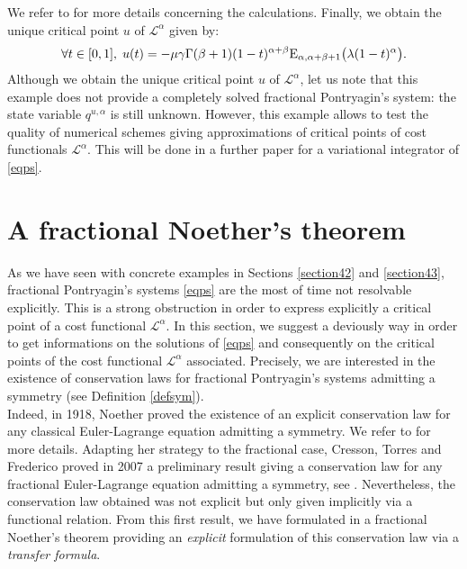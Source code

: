 \documentclass[english,11pt,reqno]{smfart}
\newcommand{\LL}{\mathcal{L}}
\begin{document}
We refer to \cite{kilb} for more details concerning the calculations. Finally, we obtain the unique critical point $u$ of $\LL^\alpha$ given by: 
\begin{equation}
\forall t \in [0,1], \; u(t) = - \mu \gamma \Gamma (\beta +1) (1-t)^{\alpha+\beta} {\rm E}_{\alpha,\alpha+\beta+1} \big( \lambda (1-t)^\alpha \big) .
\end{equation}
Although we obtain the unique critical point $u$ of $\LL^\alpha$, let us note that this example does not provide a completely solved fractional Pontryagin's system: the state variable $q^{u,\alpha}$ is still unknown. However, this example allows to test the quality of numerical schemes giving approximations of critical points of cost functionals $\LL^\alpha$. This will be done in a further paper for a variational integrator of \eqref{eqps}.

\section{A fractional Noether's theorem}\label{section5}
As we have seen with concrete examples in Sections \ref{section42} and \ref{section43}, fractional Pontryagin's systems \eqref{eqps} are the most of time not resolvable explicitly. This is a strong obstruction in order to express explicitly a critical point of a cost functional $\LL^\alpha$. In this section, we suggest a deviously way in order to get informations on the solutions of \eqref{eqps} and consequently on the critical points of the cost functional $\LL^\alpha$ associated. Precisely, we are interested in the existence of conservation laws for fractional Pontryagin's systems admitting a symmetry (see Definition \ref{defsym}). \\

Indeed, in 1918, Noether proved the existence of an explicit conservation law for any classical Euler-Lagrange equation admitting a symmetry. We refer to \cite{arno,noet2,noet} for more details. Adapting her strategy to the fractional case, Cresson, Torres and Frederico proved in 2007 a preliminary result giving a conservation law for any fractional Euler-Lagrange equation admitting a symmetry, see \cite{cres6,torr3,torr4}. Nevertheless, the conservation law obtained was not explicit but only given implicitly via a functional relation. From this first result, we have formulated in \cite{bour2} a fractional Noether's theorem providing an \textit{explicit} formulation of this conservation law via a \textit{transfer formula}. \\
\end{document}
